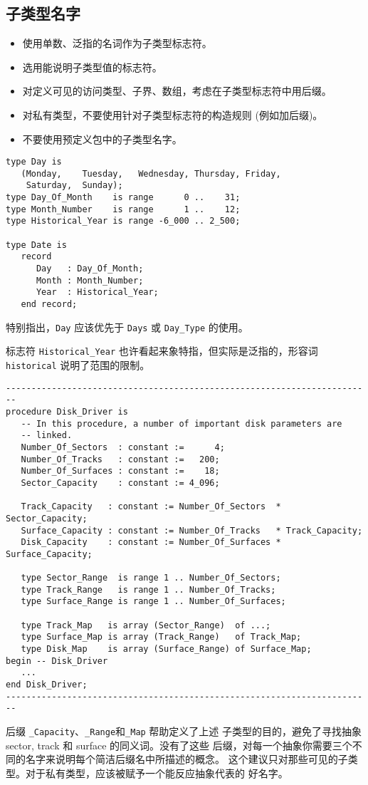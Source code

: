 \subsection{子类型名字}
\label{c:readability:subtype}
\begin{itemize}
    \item 使用单数、泛指的名词作为子类型标志符。
    \item 选用能说明子类型值的标志符。
    \item 对定义可见的访问类型、子界、数组，考虑在子类型标志符中用后缀。
    \item 对私有类型，不要使用针对子类型标志符的构造规则 (例如加后缀)。
    \item 不要使用预定义包中的子类型名字。
\end{itemize}

\begin{blockindent}
\begin{lstlisting}
type Day is
   (Monday,    Tuesday,   Wednesday, Thursday, Friday,
    Saturday,  Sunday);
type Day_Of_Month    is range      0 ..    31;
type Month_Number    is range      1 ..    12;
type Historical_Year is range -6_000 .. 2_500;

type Date is
   record
      Day   : Day_Of_Month;
      Month : Month_Number;
      Year  : Historical_Year;
   end record;
\end{lstlisting}
特别指出，\texttt{Day} 应该优先于 \texttt{Days} 或 \texttt{Day\_Type} 的使用。

标志符 \texttt{Historical\_Year} 也许看起来象特指，但实际是泛指的，形容词
\texttt{historical} 说明了范围的限制。
\begin{lstlisting}
------------------------------------------------------------------------
procedure Disk_Driver is
   -- In this procedure, a number of important disk parameters are
   -- linked.
   Number_Of_Sectors  : constant :=      4;
   Number_Of_Tracks   : constant :=   200;
   Number_Of_Surfaces : constant :=    18;
   Sector_Capacity    : constant := 4_096;

   Track_Capacity   : constant := Number_Of_Sectors  * Sector_Capacity;
   Surface_Capacity : constant := Number_Of_Tracks   * Track_Capacity;
   Disk_Capacity    : constant := Number_Of_Surfaces * Surface_Capacity;

   type Sector_Range  is range 1 .. Number_Of_Sectors;
   type Track_Range   is range 1 .. Number_Of_Tracks;
   type Surface_Range is range 1 .. Number_Of_Surfaces;

   type Track_Map   is array (Sector_Range)  of ...;
   type Surface_Map is array (Track_Range)   of Track_Map;
   type Disk_Map    is array (Surface_Range) of Surface_Map;
begin -- Disk_Driver
   ...
end Disk_Driver;
------------------------------------------------------------------------
\end{lstlisting}
后缀 \texttt{\_Capacity}、\texttt{\_Range}和\texttt{\_Map} 帮助定义了上述
子类型的目的，避免了寻找抽象 sector, track 和 surface 的同义词。没有了这些
后缀，对每一个抽象你需要三个不同的名字来说明每个简洁后缀名中所描述的概念。
这个建议只对那些可见的子类型。对于私有类型，应该被赋予一个能反应抽象代表的
好名字。
\end{blockindent}

